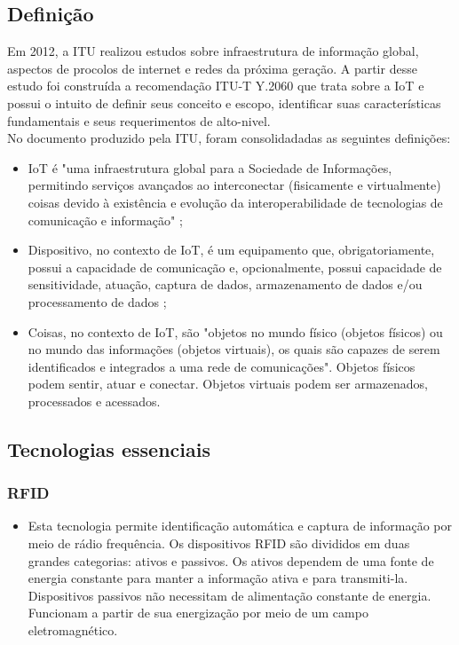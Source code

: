 \subsection{Definição}
	\quad Em 2012, a \acrfull{ITU} realizou estudos sobre infraestrutura
	de informação global, aspectos de procolos de internet e redes da próxima geração.
	A partir desse estudo foi construída a recomendação ITU-T Y.2060 \cite{ITU} que trata sobre a \acrlong{IoT}
	e possui o intuito de definir seus conceito e escopo, identificar
	suas características fundamentais e seus requerimentos de alto-nivel.
  \\ \null
  \quad	No documento produzido pela \acrshort{ITU}, foram consolidadadas as seguintes definições:
	\begin{itemize}
		\item \acrlong{IoT} é "uma infraestrutura global para a Sociedade de Informações, permitindo serviços avançados ao
		interconectar (fisicamente e virtualmente) coisas devido à existência e evolução da interoperabilidade
	de tecnologias de comunicação e informação" \cite{ITU};%
		\item Dispositivo, no contexto de \acrshort{IoT}, é um equipamento que, obrigatoriamente, possui a capacidade
		de comunicação e, opcionalmente, possui capacidade de sensitividade, atuação, captura de dados,
		armazenamento de dados e/ou processamento de dados \cite{ITU};
		\item Coisas, no contexto de \acrshort{IoT}, são "objetos
	no mundo físico (objetos físicos) ou no mundo das informações (objetos virtuais), os quais são capazes
	de serem identificados e integrados a uma rede de comunicações". Objetos físicos podem sentir, atuar e conectar.
	Objetos virtuais podem ser armazenados, processados e acessados.\cite{ITU}
	\end{itemize}
\subsection{Tecnologias essenciais}
	\subsubsection{\acrfull{RFID}}
		\begin{itemize}
			\item Esta tecnologia permite identificação automática e captura de informação por meio de rádio frequência.
			Os dispositivos \acrshort{RFID} são divididos em duas grandes categorias: ativos e passivos. Os ativos dependem
			de uma fonte de energia constante para manter a informação ativa e para transmiti-la. Dispositivos passivos não necessitam de alimentação constante de energia.
			Funcionam a partir de sua energização por meio de um campo eletromagnético.
			\cite{refrfid}
		\end{itemize}
